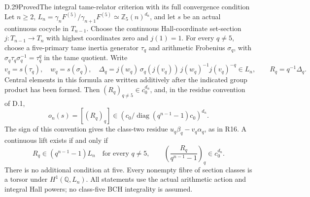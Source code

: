 \begin{statement}{D.29}{Proved}{The integral tame-relator criterion with its full convergence condition}
Let \(n\ge2\), \(L_n=\gamma_nF^{(5)}/
\gamma_{n+1}F^{(5)}\simeq\mathbb Z_5(n)^{d_n}\),
and let \(s\) be an actual continuous
cocycle in \(T_{n-1}\). Choose the
continuous Hall-coordinate set-section
\(j:T_{n-1}\to T_n\) with highest
coordinates zero and \(j(1)=1\).
For every \(q\ne5\), choose a five-primary
tame inertia generator \(\tau_q\) and
arithmetic Frobenius \(\sigma_q\), with
\(\sigma_q\tau_q\sigma_q^{-1}=\tau_q^q\)
in the tame quotient. Write
\[
  v_q=s(\tau_q),\quad w_q=s(\sigma_q),\quad
  \Delta_q=j(w_q)\,\sigma_q(j(v_q))\,
                    j(w_q)^{-1}j(v_q)^{-q}\in L_n,
  \qquad R_q=q^{-1}\Delta_q.                    \tag{D.29.1}
\]
Central elements in this formula are
written additively after the indicated
group product has been formed. Then
\((R_q)_{q\ne5}\in c_0^{d_n}\), and,
in the residue convention of D.1,
\[
 o_n(s)=[(R_q)_q]\in
 \left(c_0/\operatorname{diag}(q^{n-1}-1)c_0\right)^{d_n}.
                                                               \tag{D.29.2}
\]
The sign of this convention gives the
class-two residue
\(u_q\beta_q-v_q\alpha_q\), as in R16.
A continuous lift exists if and only if
\[
 R_q\in(q^{n-1}-1)L_n\quad\text{for every }q\ne5,
 \qquad
 \left(\frac{R_q}{q^{n-1}-1}\right)_q\in c_0^{d_n}.
                                                               \tag{D.29.3}
\]
There is no additional condition at five.
Every nonempty fibre of section classes
is a torsor under \(H^1(\mathbb Q,L_n)\).
All statements use the actual arithmetic
action and integral Hall powers; no
class-five BCH integrality is assumed.
\end{statement}
